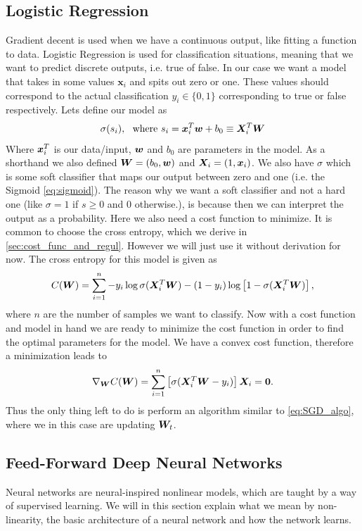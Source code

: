 \documentclass[12pt]{extarticle}
\begin{document}
\subsection{Logistic Regression}\label{sec:logistic_regression}
Gradient decent is used when we have a continuous output, like fitting a function to data. Logistic Regression is used for classification situations, meaning that we want to predict discrete outputs, i.e. true of false. In our case we want a model that takes in some values $\mathbf{x}_i$ and spits out zero or one. These values should correspond to the actual classification $y_i\in\{0,1\}$ corresponding to true or false respectively. Lets define our model as
\begin{align}
	\sigma(s_i), \ \ \text{where }s_i = \boldsymbol x_i^T \boldsymbol w + b_0 \equiv \boldsymbol X_i^T \boldsymbol W
	\label{eq:log_reg_model}
\end{align}
Where $\boldsymbol x_i^T$ is our data/input, $\boldsymbol w$ and $b_0$ are parameters in the model. As a shorthand we also defined $\boldsymbol W = (b_0, \boldsymbol w)$ and $\boldsymbol X_i = (1, \boldsymbol x_i)$. We also have $\sigma$ which is some soft classifier that maps our output between zero and one (i.e. the Sigmoid \eqref{eq:sigmoid}). The reason why we want a soft classifier and not a hard one (like $\sigma = 1$ if $s\geq0$ and $0$ otherwise.), is because then we can interpret the output as a probability. Here we also need a cost function to minimize. It is common to choose the cross entropy, which we derive in \ref{sec:cost_func_and_regul}. However we will just use it without derivation for now. The cross entropy for this model is given as
\begin{align}
	C(\boldsymbol W) = \sum_{i = 1}^{n} -y_i \log\sigma(\boldsymbol X_i^T \boldsymbol W) - (1 - y_i)\log\left[1 - \sigma(\boldsymbol X^T_i \boldsymbol W)\right],
\end{align}
where $n$ are the number of samples we want to classify. Now with a cost function and model in hand we are ready to minimize the cost function in order to find the optimal parameters for the model. We have a convex cost function, therefore a minimization leads to
\begin{align}
	\nabla_{\boldsymbol W} C(\boldsymbol W) = \sum_{i = 1}^n \left[\sigma(\boldsymbol X_i^T \boldsymbol W - y_i)\right]\boldsymbol X_i = \boldsymbol 0.
\end{align}
Thus the only thing left to do is perform an algorithm similar to \ref{eq:SGD_algo}, where we in this case are updating $\boldsymbol W_t$.

\subsection{Feed-Forward Deep Neural Networks}\label{sec:NeuralNetwork}
Neural networks are neural-inspired nonlinear models, which are taught by a way of supervised learning. We will in this section explain what we mean by non-linearity, the basic architecture of a neural network and how the network learns. 
\end{document}
